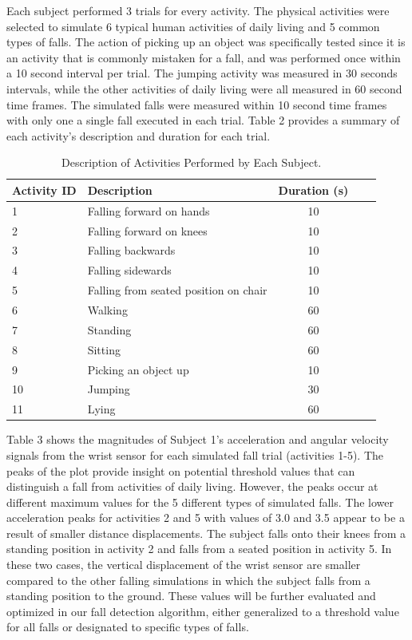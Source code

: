 \documentclass{llncs}
\begin{document}
	Each subject performed 3 trials for every activity. The physical activities were selected to simulate 6 typical human activities of daily living and 5 common types of falls. The action of picking up an object was specifically tested since it is an activity that is commonly mistaken for a fall, and was performed once within a 10 second interval per trial. The jumping activity was measured in 30 seconds intervals, while the other activities of daily living were all measured in 60 second time frames. The simulated falls were measured within 10 second time frames with only one a single fall executed in each trial. Table 2 provides a summary of each activity's description and duration for each trial.
	
\begin{table}[h!]
	\begin{center}
		\caption{Description of Activities Performed by Each Subject.}
		\label{table2}
		\begin{tabular}{llclr}
			\toprule
			Activity ID & Description & Duration (s)\\
			\midrule
			1 &  Falling forward on hands & 10\\
			2 &  Falling forward on knees & 10\\
			3 & Falling backwards & 10\\
			4 & Falling sidewards & 10\\
			5 & Falling from seated position on chair & 10\\
			6 & Walking & 60\\
			7 & Standing & 60\\
			8 & Sitting & 60\\
			9 & Picking an object up & 10\\
			10 & Jumping & 30\\
			11 & Lying & 60\\
			\bottomrule
		\end{tabular}
	\end{center}
\end{table}

	Table 3 shows the magnitudes of Subject 1's acceleration and angular velocity signals from the wrist sensor for each simulated fall trial (activities 1-5). The peaks of the plot provide insight on potential threshold values that can distinguish a fall from activities of daily living. However, the peaks occur at different maximum values for the 5 different types of simulated falls. The lower acceleration peaks for activities 2 and 5 with values of 3.0 and 3.5 appear to be a result of smaller distance displacements. The subject falls onto their knees from a standing position in activity 2 and falls from a seated position in activity 5. In these two cases, the vertical displacement of the wrist sensor are smaller compared to the other falling simulations in which the subject falls from a standing position to the ground. These values will be further evaluated and optimized in our fall detection algorithm, either generalized to a threshold value for all falls or designated to specific types of falls.
	
\end{document}
